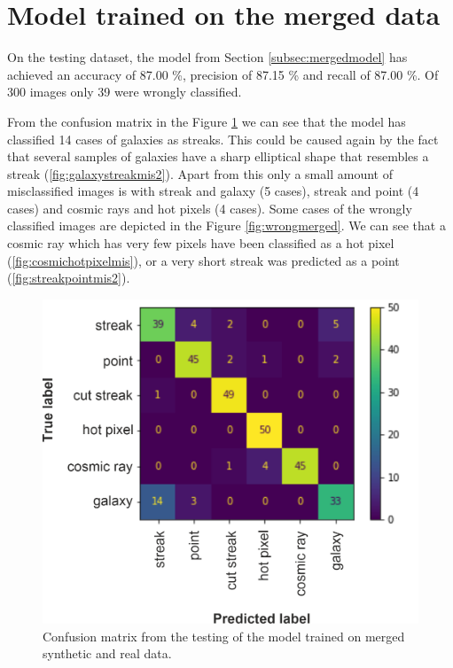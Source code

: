 \section{Model trained on the merged data}


On the testing dataset, the model from Section \ref{subsec:mergedmodel} has achieved an accuracy of 87.00 \%, precision of 87.15 \% and recall of 87.00 \%. Of 300 images only 39 were wrongly classified. 

From the confusion matrix in the Figure \ref{img:confmatrixmerged} we can see that the model has classified 14 cases of galaxies as streaks. This could be caused again by the fact that several samples of galaxies have a sharp elliptical shape that resembles a streak (\ref{fig:galaxystreakmis2}). 
Apart from this only a small amount of misclassified images is with streak and galaxy (5 cases), streak and point (4 cases) and cosmic rays and hot pixels (4 cases). Some cases of the wrongly classified images are depicted in the Figure \ref{fig:wrongmerged}. We can see that a cosmic ray which has very few pixels have been classified as a hot pixel (\ref{fig:cosmichotpixelmis}), or a very short streak was predicted as a point (\ref{fig:streakpointmis2}). 

\begin{figure}[h]
    \centering
    \includegraphics[width=.5\textwidth]{images/confusionMatrix13r_0.png}
    \caption{Confusion matrix from the testing of the model trained on merged synthetic and real data.}
    \label{img:confmatrixmerged}
\end{figure}

